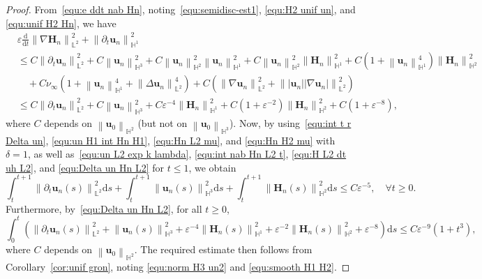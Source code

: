 \documentclass[11pt, reqno]{amsart}
\theoremstyle{definition}
\numberwithin{equation}{section}
\newcommand{\bff}{\boldsymbol}
\newcommand{\bb}{\mathbb}
\newcommand{\ddt}{\frac{\mathrm{d}}{\mathrm{d}t}}
\newcommand{\ds}{\mathrm{d}s}
\newcommand{\norm}[2]{\left\|{#1}\right\|_{#2}}
\begin{document}
\begin{proof}
From~\eqref{equ:e ddt nab Hn}, noting~\eqref{equ:semidisc-est1}, \eqref{equ:H2 unif un}, and \eqref{equ:unif H2 Hn}, we have
\begin{align*}
    &\varepsilon \ddt \norm{\nabla \bff{H}_n}{\bb{L}^2}^2
    +
    \norm{\partial_t \bff{u}_n}{\bb{H}^1}^2
    \\
    &\leq
    C\norm{\partial_t \bff{u}_n}{\bb{L}^2}^2 + C\norm{\bff{u}_n}{\bb{H}^3}^2
    +
    C\norm{\bff{u}_n}{\bb{H}^2}^2 \norm{\bff{u}_n}{\bb{H}^1}^2
    +
    C\norm{\bff{u}_n}{\bb{H}^2}^2 \norm{\bff{H}_n}{\bb{H}^1}^2
    +
    C\left(1+\norm{\bff{u}_n}{\bb{H}^1}^4 \right) \norm{\bff{H}_n}{\bb{H}^2}^2
    \nonumber \\
    &\quad
    +
    C \nu_\infty\left(1+\norm{\bff{u}_n}{\bb{H}^1}^4 + \norm{\Delta \bff{u}_n}{\bb{L}^2}^4 \right)
    +
    C \left(\norm{\nabla \bff{u}_n}{\bb{L}^2}^2 + \norm{|\bff{u}_n| |\nabla \bff{u}_n|}{\bb{L}^2}^2 \right)
    \\
    &\leq
    C\norm{\partial_t \bff{u}_n}{\bb{L}^2}^2 + C\norm{\bff{u}_n}{\bb{H}^3}^2
    +
    C\varepsilon^{-4} \norm{\bff{H}_n}{\bb{H}^1}^2 
    +
    C\left(1+\varepsilon^{-2} \right) \norm{\bff{H}_n}{\bb{H}^2}^2
    +
    C \left(1+  \varepsilon^{-8} \right),
\end{align*}
where $C$ depends on $\norm{\bff{u}_0}{\bb{H}^2}$ (but not on $\norm{\bff{u}_0}{\bb{H}^3}$).
Now, by using~\eqref{equ:int t r Delta un}, \eqref{equ:un H1 int Hn H1}, \eqref{equ:Hn L2 mu}, and \eqref{equ:Hn H2 mu} with $\delta=1$, as well as~\eqref{equ:un L2 exp k lambda}, \eqref{equ:int nab Hn L2 t}, \eqref{equ:H L2 dt uh L2}, and \eqref{equ:Delta un Hn L2} for $t\leq 1$, we obtain
\begin{equation*}
    \int_t^{t+1} \norm{\partial_t \bff{u}_n(s)}{\bb{L}^2}^2 \ds  
    + 
    \int_t^{t+1} \norm{\bff{u}_n(s)}{\bb{H}^3}^2 \ds 
    +
    \int_t^{t+1} \norm{\bff{H}_n(s)}{\bb{H}^2}^2 \ds
    \leq C \varepsilon^{-5}, \quad\forall t\geq 0.
\end{equation*}
Furthermore, by~\eqref{equ:Delta un Hn L2}, for all $t\geq 0$,
\begin{equation*}
    \int_0^t \left(\norm{\partial_t \bff{u}_n(s)}{\bb{L}^2}^2 
    +
    \norm{\bff{u}_n(s)}{\bb{H}^3}^2
    +
    \varepsilon^{-4} \norm{\bff{H}_n(s)}{\bb{H}^1}^2
    +
    \varepsilon^{-2} \norm{\bff{H}_n(s)}{\bb{H}^2}^2
    +
    \varepsilon^{-8}\right)
     \ds 
     \leq 
     C\varepsilon^{-9} (1+t^3),
\end{equation*}
where $C$ depends on $\norm{\bff{u}_0}{\bb{H}^2}$.
The required estimate then follows from Corollary~\ref{cor:unif gron}, noting \eqref{equ:norm H3 un2} and \eqref{equ:smooth H1 H2}.
\end{proof}
\end{document}
